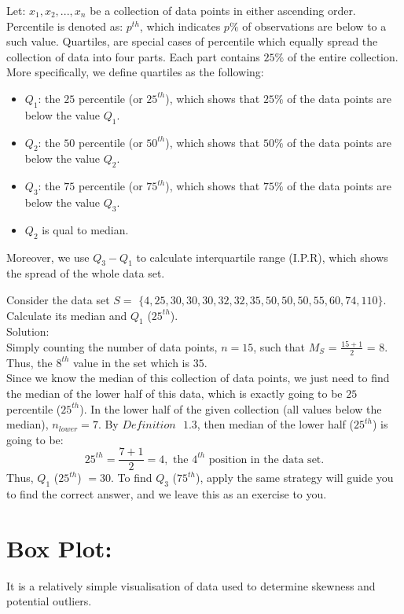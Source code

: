 \begin{definition}
Let: $x_1, x_2, ..., x_n$ be a collection of data points in either ascending order. Percentile is denoted as: $p^{th}$, which indicates $p \%$ of observations are below to a such value. Quartiles, are special cases of percentile which equally spread the collection of data into four parts. Each part contains $25\%$ of the entire collection. More specifically, we define quartiles as the following:
\begin{itemize}
	\item $Q_1$: the $25$ percentile (or $25^{th}$), which shows that $25\%$ of the data points are below the value $Q_1$.
	\item $Q_2$: the $50$ percentile (or $50^{th}$), which shows that $50\%$ of the data points are below the value $Q_2$.
	\item $Q_3$: the $75$ percentile (or $75^{th}$), which shows that $75\%$ of the data points are below the value $Q_3$.
	\item $Q_2$ is qual to median.
\end{itemize}
Moreover, we use $Q_3 - Q_1$ to calculate interquartile range (I.P.R), which shows the spread of the whole data set.
\end{definition}
	
\begin{example}
Consider the data set $S = $ $\{4, 25, 30, 30, 30, 32, 32, 35, 50, 50, 50, 55, 60, 74, 110\}$. Calculate its median and $Q_1$ ($25^{th}$).\\


Solution:\\

Simply counting the number of data points, $n = 15$, such that $M_{S}$ = $\frac{15 + 1}{2}$ = $8$. Thus, the $8^{th}$ value in the set which is $35$.\\

Since we know the median of this collection of data points, we just need to find the median of the lower half of this data, which is exactly going to be $25$ percentile ($25^{th}$). In the lower half of the given collection (all values below the median), $n_{lower} = 7$. By $Definition \text{ } 1.3$, then median of the lower half ($25^{th}$) is going to be: \[ 25^{th} = \frac{7+1}{2} = 4, \text{ the $4^{th}$ position in the data set}.\] Thus, $Q_1$ ($25^{th}$) $= 30$. To find $Q_3$ ($75^{th}$), apply the same strategy will guide you to find the correct answer, and we leave this as an exercise to you.

\end{example}
	
\section{Box Plot:}

It is a relatively simple visualisation of data used to determine skewness and potential outliers. 
	
	
	
	
	
	





